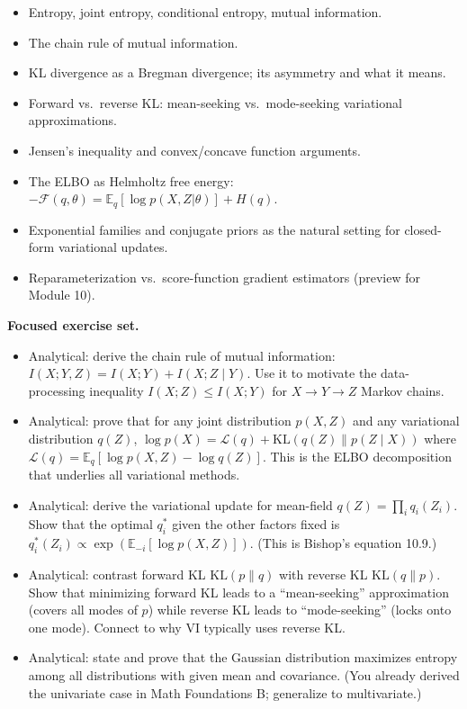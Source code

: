 \begin{itemize}
\tightlist
\item
  Entropy, joint entropy, conditional entropy, mutual information.
\item
  The chain rule of mutual information.
\item
  KL divergence as a Bregman divergence; its asymmetry and what it
  means.
\item
  Forward vs.~reverse KL: mean-seeking vs.~mode-seeking variational
  approximations.
\item
  Jensen's inequality and convex/concave function arguments.
\item
  The ELBO as Helmholtz free energy:
  \(-\mathcal{F}(q, \theta) = \mathbb{E}_q[\log p(X,Z|\theta)] + H(q)\).
\item
  Exponential families and conjugate priors as the natural setting for
  closed-form variational updates.
\item
  Reparameterization vs.~score-function gradient estimators (preview for
  Module 10).
\end{itemize}

\textbf{Focused exercise set.}

\begin{itemize}
\tightlist
\item
  Analytical: derive the chain rule of mutual information:
  \(I(X; Y, Z) = I(X; Y) + I(X; Z \mid Y)\). Use it to motivate the
  data-processing inequality \(I(X; Z) \leq I(X; Y)\) for
  \(X \to Y \to Z\) Markov chains.
\item
  Analytical: prove that for any joint distribution \(p(X, Z)\) and any
  variational distribution \(q(Z)\),
  \(\log p(X) = \mathcal{L}(q) + \text{KL}(q(Z) \| p(Z \mid X))\) where
  \(\mathcal{L}(q) = \mathbb{E}_q[\log p(X, Z) - \log q(Z)]\). This is
  the ELBO decomposition that underlies all variational methods.
\item
  Analytical: derive the variational update for mean-field
  \(q(Z) = \prod_i q_i(Z_i)\). Show that the optimal \(q_i^*\) given the
  other factors fixed is
  \(q_i^*(Z_i) \propto \exp(\mathbb{E}_{-i}[\log p(X, Z)])\). (This is
  Bishop's equation 10.9.)
\item
  Analytical: contrast forward KL \(\text{KL}(p \| q)\) with reverse KL
  \(\text{KL}(q \| p)\). Show that minimizing forward KL leads to a
  ``mean-seeking'' approximation (covers all modes of \(p\)) while
  reverse KL leads to ``mode-seeking'' (locks onto one mode). Connect to
  why VI typically uses reverse KL.
\item
  Analytical: state and prove that the Gaussian distribution maximizes
  entropy among all distributions with given mean and covariance. (You
  already derived the univariate case in Math Foundations B; generalize
  to multivariate.)
\end{itemize}

